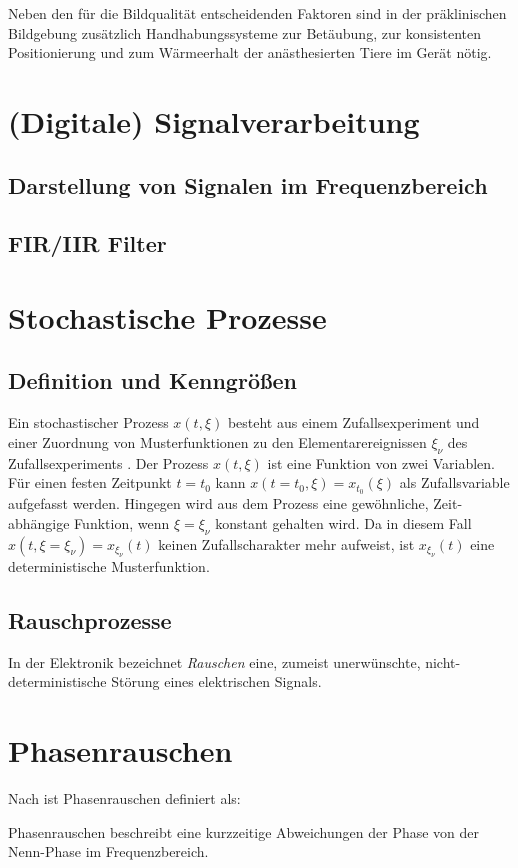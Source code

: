 Neben den für die Bildqualität entscheidenden Faktoren sind in der präklinischen Bildgebung zusätzlich Handhabungssysteme zur Betäubung, zur konsistenten Positionierung und zum Wärmeerhalt der anästhesierten Tiere im Gerät nötig.

\section{(Digitale) Signalverarbeitung}

\subsection{Darstellung von Signalen im Frequenzbereich}
\subsection{FIR/IIR Filter}

\section{Stochastische Prozesse}

\subsection{Definition und Kenngrößen}
Ein stochastischer Prozess $x(t,\xi)$ besteht aus einem Zufallsexperiment und einer Zuordnung von Musterfunktionen zu den Elementarereignissen $\xi_\nu$ des Zufallsexperiments \cite[S.~243]{Leon2015}. Der Prozess $x(t,\xi)$ ist eine Funktion von zwei Variablen. Für einen festen Zeitpunkt $t=t_0$ kann $x(t=t_0,\xi)=x_{t_0}(\xi)$ als Zufallsvariable aufgefasst werden. Hingegen wird aus dem Prozess eine gewöhnliche, Zeit-abhängige Funktion, wenn $\xi=\xi_\nu$ konstant gehalten wird. Da in diesem Fall $x(t,\xi=\xi_\nu)=x_{\xi_\nu}(t)$ keinen Zufallscharakter mehr aufweist, ist $x_{\xi_\nu}(t)$ eine deterministische Musterfunktion.



\subsection{Rauschprozesse}
In der Elektronik bezeichnet \textit{Rauschen} eine, zumeist unerwünschte, nicht-\-deterministische Störung eines elektrischen Signals.

\section{Phasenrauschen}
Nach \cite{IEEErandom} ist Phasenrauschen definiert als:
\begin{definition}[Phasenrauschen]
	Phasenrauschen beschreibt eine kurzzeitige Abweichungen der Phase von der Nenn-Phase im Frequenzbereich. 
\end{definition}

